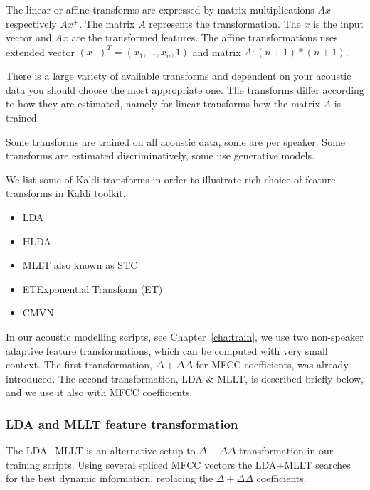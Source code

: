 {The linear or affine transforms are expressed by matrix multiplications $Ax$ respectively $Ax^+$.
The matrix $A$ represents the transformation. 
The $x$ is the input vector and $Ax$ are the transformed features.
The affine transformations uses extended vector $(x^+)^T = (x_1, \ldots, x_n, 1)$ and matrix $A: (n+1)*(n+1)$.

There is a large variety of available transforms and dependent on your acoustic data you should choose the most appropriate one.
The transforms differ according to how they are estimated, namely for linear transforms how the matrix $A$ is trained.

Some transforms are trained on all acoustic data, some are per speaker.
Some transforms are estimated discriminatively, some use generative models.

We list some of Kaldi transforms in order to illustrate rich choice of feature transforms in Kaldi toolkit.
\begin{itemize}
    \item \acl{LDA}\cite{gopinath1998maximum}
    \item \acl{HLDA}\cite{gales1999semi}
    \item \acl{MLLT} also known as \acl{STC}\cite{gopinath1998maximum}
    \item \acl{ET}Exponential Transform (ET)\cite{povey2011exponential}
    \item \acl{CMVN}\cite{molau2003feature}
\end{itemize}

In our acoustic modelling scripts, see Chapter~\ref{cha:train},  we use two non-speaker adaptive feature transformations, which can be computed with very small context. 
The first transformation, $\Delta+\Delta\Delta$  for \ac{MFCC} coefficients, was already introduced.
The second transformation, \ac{LDA} \& \ac{MLLT}, is described briefly below, and we use it also with \ac{MFCC} coefficients.

\subsubsection*{\acl{LDA} and \ac{MLLT} feature transformation}
The \ac{LDA}+\ac{MLLT} is an alternative setup to $\Delta+\Delta\Delta$ transformation in our training scripts.
Using several spliced \ac{MFCC} vectors the \ac{LDA}+\ac{MLLT} searches for the best dynamic information, replacing the $\Delta+\Delta\Delta$ coefficients.

}
